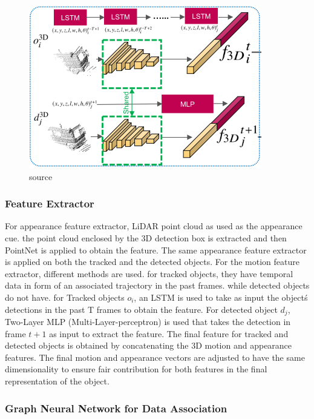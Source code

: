 \documentclass[10pt,twocolumn,letterpaper]{article}
\begin{document}
\begin{figure}
	\includegraphics[width=\linewidth]{media/tracking_net.png}
   \caption{source \cite{weng2020gnn3dmot}}
\label{fig:tracking_feature_ext}
\end{figure}

\subsubsection{Feature Extractor}

For appearance feature extractor, LiDAR point cloud as used as the appearance cue. the point cloud enclosed by the 3D detection box is extracted and then PointNet \cite{pointnet} is applied to obtain the feature. The same appearance feature extractor is applied on both the tracked and the detected objects. For the motion feature extractor, different methods are used. for tracked objects, they have temporal data in form of an associated trajectory in the past frames. while detected objects do not have. for Tracked objects $o_{i}$, an LSTM is used to take as input the object\'s detections in the past T frames to obtain the feature. For detected object $d_{j}$, Two-Layer MLP (Multi-Layer-perceptron) is used that takes the detection in frame $t+1$ as input to extract the feature. The final feature for tracked and detected objects is obtained by concatenating the 3D motion and appearance features. The final motion and appearance vectors are adjusted to have the same dimensionality to ensure fair contribution for both features in the final representation of the object.



\subsubsection{Graph Neural Network for Data Association}
\end{document}
